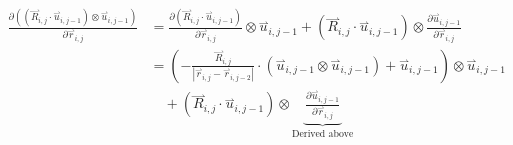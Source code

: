 \documentclass{article}
\renewcommand{\ij}{_{i,j}}
\newcommand{\ijj}{_{i,j-1}}
\newcommand{\ijk}{_{i,j-2}}
\newcommand{\ijjj}{_{i,j-2}}
\newcommand{\magn}[1]{\left\vert #1 \right\vert }
\renewcommand{\part}[2]{\frac{\partial #1 }{\partial #2}}
\newcommand{\harp}{\overset{\rightharpoonup}}
\newcommand{\ten}[1]{\underline{\underline{#1}}}
\newcommand{\rij}{\harp r \ij}
\newcommand{\Rij}{\harp R \ij}
\newcommand{\rijj}{\harp r \ijj}
\newcommand{\rijjj}{\harp r \ijjj}
\newcommand{\uijj}{\harp u \ijj}
\begin{document}
\begin{align*}
  \part{\left(\left(\harp R\ij \cdot \harp u \ijj \right) \otimes 
  \harp u \ijj \right)
  }{\harp r\ij} 
  &= 
  \part{\left(\harp R\ij \cdot \harp u \ijj \right)}{\harp r\ij}  
  \otimes \harp u \ijj  + 
  \left(\harp R\ij \cdot \harp u \ijj \right)
  \otimes 
  \part{\harp u \ijj }{\harp r\ij}
   \\
  &= 
  \left(
  -\frac{\harp R \ij}{\magn{\rij - \rijjj}} \cdot (\uijj \otimes \uijj ) 
  +  \uijj
  \right) \otimes \uijj\\
  & \quad 
  +  
  \left(\harp R\ij \cdot \harp u \ijj \right)
  \otimes 
  \underbrace{\part{\harp u \ijj }{\harp r\ij} }_{\text{Derived above}}
\end{align*}

\end{document}

